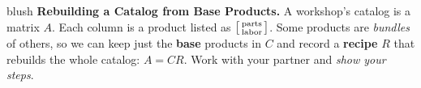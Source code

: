 \documentclass[10pt]{article}
\begin{document}

\vspace{0.10in}

\begin{headlinebox}{blush}
\small\textbf{Rebuilding a Catalog from Base Products.} A workshop's catalog is a matrix $A$. Each
column is a product listed as $\begin{bsmallmatrix} \text{parts} \\ \text{labor} \end{bsmallmatrix}$.
Some products are \emph{bundles} of others, so we can keep just the \textbf{base} products in $C$ and
record a \textbf{recipe} $R$ that rebuilds the whole catalog: $A=CR$. Work with your partner and
\emph{show your steps}.
\end{headlinebox}

\vspace{0.10in}
\end{document}
